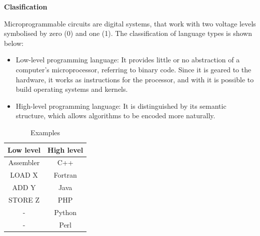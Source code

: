 \documentclass[11pt, letterpaper, english]{article}
\begin{document}
\vspace{0.5 cm}

   \textbf{Clasification}
   \par{Microprogrammable circuits are digital systems, that work with two voltage levels symbolised by zero (0) and one (1). The classification of language types is shown below:}
   
   \begin{itemize}
       \item{Low-level programming language: It provides little or no abstraction of a computer's microprocessor, referring to  binary code. Since it is geared to the hardware, it works as instructions for the processor, and with it is possible to build operating systems and kernels.}
        \item{High-level programming language: It is distinguished by its semantic structure, which allows algorithms to be encoded more naturally.}
   \end{itemize} 
   
  
    \begin{table}[ht]
        \centering
        \resizebox{4.5 cm}{!} {
        \begin{tabular}{| c | c |}
            \hline
            Low level  & High level \\ \hline
            Assembler   & C++ \\
            LOAD X      & Fortran \\
            ADD Y       & Java \\
            STORE Z     & PHP \\
            -           & Python \\
            -           & Perl \\ \hline
        \end{tabular}}
        \caption{Examples}
   \end{table}
   
\end{document}
